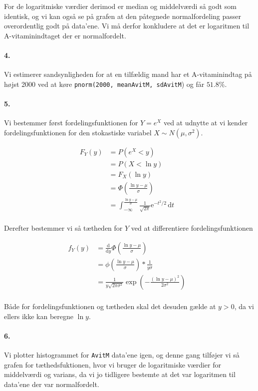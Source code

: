 \documentclass[12pt]{article}
\begin{document}
For de logaritmiske værdier derimod er median og middelværdi så godt som identisk, og vi kan også se på grafen at den påtegnede normalfordeling passer overordentlig godt på data'ene. Vi må derfor konkludere at det er logaritmen til A-vitaminindtaget der er normalfordelt.

\paragraph{4.}
Vi estimerer sandsynligheden for at en tilfældig mand har et A-vitaminindtag på højst 2000 ved at køre \verb!pnorm(2000, meanAvitM, sdAvitM!) og får $51.8\%$.

\paragraph{5.}
Vi bestemmer først fordelingsfunktionen for $Y = e^X$ ved at udnytte at vi kender fordelingsfunktionen for den stokastiske variabel $X \sim N(\mu, \sigma^2)$.

\begin{align*}
  F_Y(y) &= P(e^X < y) &\\
  &= P(X < \ln y) &\\
  &= F_X(\ln y) &\\
  &= \Phi \left( \frac{\ln{y} - \mu}{\sigma} \right) &\\
  &= \int_{-\infty}^{\frac{\ln{y}-\mu}{\sigma}} \frac{1}{\sqrt{2\pi}} \mathrm{e}^{-t^2/2}\,\mathrm{d}t &\\
\end{align*}

Derefter bestemmer vi så tætheden for $Y$ ved at differentiere fordelingsfunktionen

\begin{align*}
  f_Y(y) &= \frac{\mathrm{d}}{\mathrm{d}y} \Phi \left( \frac{\ln{y} - \mu}{\sigma} \right) &\\
         &= \phi \left( \frac{\ln{y} - \mu}{\sigma} \right) * \frac{1}{y\sigma} &\\
         &= \frac{1}{y\sqrt{2\pi\sigma^2}} \exp \left(-\frac{(\ln{y} - \mu)^2}{2\sigma^2} \right) &\\
\end{align*}

Både for fordelingsfunktionen og tætheden skal det desuden gælde at $y > 0$, da vi ellers ikke kan beregne $\ln{y}$.

\paragraph{6.}
Vi plotter histogrammet for \verb!AvitM! data'ene igen, og denne gang tilføjer vi så grafen for tæthedsfuktionen, hvor vi bruger de logaritmiske værdier for middelværdi og varians, da vi jo tidligere bestemte at det var logaritmen til data'ene der var normalfordelt.
\end{document}
